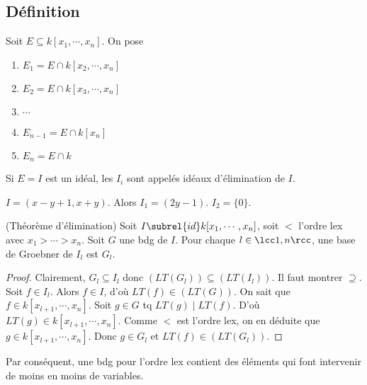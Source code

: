         \subsection{Définition}
            \begin{defi}
                Soit $E \subseteq k[x_1, \cdots, x_n]$. On pose
                \begin{enumerate}
                    \item $E_1 = E \cap k[x_2, \cdots, x_n]$
                    \item $E_2 = E \cap k[x_3, \cdots, x_n]$
                    \item $\cdots$
                    \item $E_{n-1} = E \cap k[x_n]$
                    \item $E_n = E \cap k$
                \end{enumerate}
                Si $E = I$ est un idéal, les $I_i$ sont appelés idéaux d'élimination de $I$.
            \end{defi}
            \begin{expl}
                $I = (x-y+1, x+y)$. Alors $I_1 = (2y - 1)$. $I_2 = \{0\}$.
            \end{expl}
            \begin{theo} (Théorème d'élimination)
                Soit $I \subrel{id} k[x_1, \cdots, x_n]$, soit $<$ l'ordre lex avec $x_1 > \cdots > x_n$. Soit $G$ une bdg de $I$. Pour chaque $l \in \lcc 1,n \rcc$, une base de Groebner de $I_l$ est $G_l$.
            \end{theo}
            \begin{proof}
                Clairement, $G_l \subseteq I_l$ donc $(LT(G_l)) \subseteq (LT(I_l))$. Il faut montrer $\supseteq$. Soit $f \in I_l$. Alors $f \in I$, d'où $LT(f) \in (LT(G))$. On sait que $f \in k[x_{l+1}, \cdots, x_n]$. Soit $g \in G$ tq $LT(g) \mid LT(f)$. D'où $LT(g) \in k[x_{l+1}, \cdots, x_n]$. Comme $<$ est l'ordre lex, on en déduite que $g \in k[x_{l+1}, \cdots, x_n]$. Donc $g \in G_l$ et $LT(f) \in (LT(G_l))$.
            \end{proof}
            Par conséquent, une bdg pour l'ordre lex contient des éléments qui font intervenir de moins en moins de variables.

